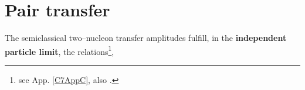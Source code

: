 \section{Pair transfer}\label{trans_nutAppA}
The semiclassical two--nucleon transfer amplitudes fulfill, in the \textbf{independent particle limit}, the relations\footnote{see App. \ref{C7AppC}, also \cite{Potel:13}.},




%



